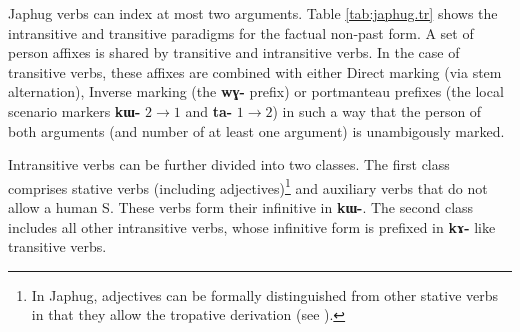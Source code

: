 \documentclass[oneside,a4paper,11pt]{article}
\newcommand{\ipa}[1]{{\phon\textbf{\mbox{#1}}}} %
\begin{document}
Japhug verbs can index at most two arguments. Table \ref{tab:japhug.tr} shows the intransitive and transitive paradigms for the factual non-past form. A set of person affixes is shared by transitive and intransitive verbs. In the case of transitive verbs, these affixes are combined with either Direct marking (via stem alternation), Inverse marking (the \ipa{wɣ-} prefix) or portmanteau prefixes (the local scenario markers \ipa{kɯ-} $2\rightarrow1$ and \ipa{ta-} $1\rightarrow2$) in such a way that the person of both arguments (and number of at least one argument) is unambigously marked.

Intransitive verbs can be further divided into two classes. The first class comprises stative verbs (including adjectives)\footnote{In Japhug, adjectives can be formally distinguished from other stative verbs in that they allow the tropative derivation (see \citealt{jacques13tropative}).} and auxiliary verbs that do not allow a human S. These verbs form their infinitive in \ipa{kɯ-}. The second class includes all other intransitive verbs, whose infinitive form is prefixed in \ipa{kɤ-} like transitive verbs.
\end{document}
